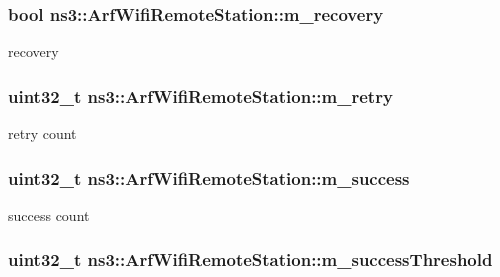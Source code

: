 \subsubsection[{\texorpdfstring{m\+\_\+recovery}{m_recovery}}]{\setlength{\rightskip}{0pt plus 5cm}bool ns3\+::\+Arf\+Wifi\+Remote\+Station\+::m\+\_\+recovery}\hypertarget{structns3_1_1ArfWifiRemoteStation_a9a6b4c7cb9d2ab847e52ad0cd4c3b1f6}{}\label{structns3_1_1ArfWifiRemoteStation_a9a6b4c7cb9d2ab847e52ad0cd4c3b1f6}


recovery 

\subsubsection[{\texorpdfstring{m\+\_\+retry}{m_retry}}]{\setlength{\rightskip}{0pt plus 5cm}uint32\+\_\+t ns3\+::\+Arf\+Wifi\+Remote\+Station\+::m\+\_\+retry}\hypertarget{structns3_1_1ArfWifiRemoteStation_a835be8f21db1619f76beb90bd1e16ac2}{}\label{structns3_1_1ArfWifiRemoteStation_a835be8f21db1619f76beb90bd1e16ac2}


retry count 

\subsubsection[{\texorpdfstring{m\+\_\+success}{m_success}}]{\setlength{\rightskip}{0pt plus 5cm}uint32\+\_\+t ns3\+::\+Arf\+Wifi\+Remote\+Station\+::m\+\_\+success}\hypertarget{structns3_1_1ArfWifiRemoteStation_afec8673d7ab25c88e63fc9bc725a29ea}{}\label{structns3_1_1ArfWifiRemoteStation_afec8673d7ab25c88e63fc9bc725a29ea}


success count 

\subsubsection[{\texorpdfstring{m\+\_\+success\+Threshold}{m_successThreshold}}]{\setlength{\rightskip}{0pt plus 5cm}uint32\+\_\+t ns3\+::\+Arf\+Wifi\+Remote\+Station\+::m\+\_\+success\+Threshold}\hypertarget{structns3_1_1ArfWifiRemoteStation_abdbbe7ba0558edd08e69c4b783c4de41}{}\label{structns3_1_1ArfWifiRemoteStation_abdbbe7ba0558edd08e69c4b783c4de41}


